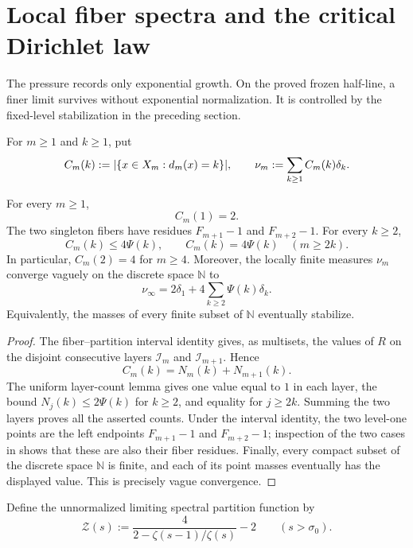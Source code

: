 \ifdefined\supplementonly
\else
\section{Local fiber spectra and the critical Dirichlet law}
\label{sec:local-spectrum}

The pressure records only exponential growth.  On the proved frozen
half-line, a finer limit survives without exponential normalization.  It is
controlled by the fixed-level stabilization in the preceding section.

For \(m\ge1\) and \(k\ge1\), put
\[
 C_m(k):=\lvert \{x\in X_m:d_m(x)=k\} \rvert,
 \qquad
 \nu_m:=\sum_{k\ge1}C_m(k)\delta_k.
\]

\begin{theorem}
\label{thm:local-fiber-spectrum}
For every \(m\ge1\),
\[
 C_m(1)=2.
\]
The two singleton fibers have residues
\(F_{m+1}-1\) and \(F_{m+2}-1\).  For every \(k\ge2\),
\[
 C_m(k)\le4\Psi(k),
 \qquad
 C_m(k)=4\Psi(k)\quad(m\ge2k).
\]
In particular, \(C_m(2)=4\) for \(m\ge4\).  Moreover, the locally finite
measures \(\nu_m\) converge vaguely on the discrete space \(\mathbb N\) to
\[
 \nu_\infty=2\delta_1+4\sum_{k\ge2}\Psi(k)\delta_k.
\]
Equivalently, the masses of every finite subset of \(\mathbb N\) eventually
stabilize.
\end{theorem}

\begin{proof}
The fiber--partition interval identity gives, as multisets, the values of
\(R\) on the disjoint consecutive layers \(\mathcal I_m\) and
\(\mathcal I_{m+1}\).  Hence
\begin{equation}
 C_m(k)=N_m(k)+N_{m+1}(k).
 \label{eq:fiber-level-two-layer-count}
\end{equation}
The uniform layer-count lemma gives one value equal to \(1\) in each layer,
the bound \(N_j(k)\le2\Psi(k)\) for \(k\ge2\), and equality for
\(j\ge2k\).  Summing the two layers proves all the asserted counts.  Under
the interval identity, the two level-one points are the left endpoints
\(F_{m+1}-1\) and \(F_{m+2}-1\); inspection of the two cases in
 shows that these are also their fiber
residues.  Finally, every compact subset of the discrete space
\(\mathbb N\) is finite, and each of its point masses eventually has the
displayed value.  This is precisely vague convergence.
\end{proof}

Define the unnormalized limiting spectral partition function by
\[
 \mathcal Z(s):=\frac{4}{2-\zeta(s-1)/\zeta(s)}-2
 \qquad(s>\sigma_0).
\]

